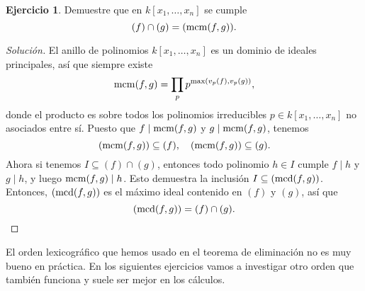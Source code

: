 \documentclass{article}
\theoremstyle{definition}
\newtheorem{ejerc}{Ejercicio}
\newenvironment{solucion}{\begin{proof}[Solución]}{\end{proof}}
\begin{document}
\begin{ejerc}
  Demuestre que en $k [x_1,\ldots,x_n]$ se cumple
  $$(f) \cap (g) = (\operatorname{mcm} (f,g)).$$

  \ifdefined\solutions\begin{solucion}
    El anillo de polinomios $k [x_1,\ldots,x_n]$ es un dominio de ideales
    principales, así que siempre existe
    $$\operatorname{mcm} (f,g) = \prod_p p^{\max (v_p (f), v_p (g))},$$
    donde el producto es sobre todos los polinomios irreducibles
    $p \in k [x_1,\ldots,x_n]$ no asociados entre sí.  Puesto que
    $f \mid \operatorname{mcm} (f,g)$ y $g \mid \operatorname{mcm} (f,g)$, tenemos
    $$(\operatorname{mcm} (f,g)) \subseteq (f), \quad (\operatorname{mcm} (f,g)) \subseteq (g).$$
    Ahora si tenemos $I \subseteq (f) \cap (g)$, entonces todo polinomio
    $h \in I$ cumple $f \mid h$ y $g \mid h$, y luego $\operatorname{mcm} (f,g) \mid h$. Esto
    demuestra la inclusión $I \subseteq (\operatorname{mcd} (f,g))$. Entonces, $(\operatorname{mcd} (f,g))$
    es el máximo ideal contenido en $(f)$ y $(g)$, así que
    \[ (\operatorname{mcd} (f,g)) = (f) \cap (g). \qedhere \]
  \end{solucion}\fi
\end{ejerc}

El orden lexicográfico que hemos usado en el teorema de eliminación no es muy
bueno en práctica. En los siguientes ejercicios vamos a investigar otro orden
que también funciona y suele ser mejor en los cálculos.
\end{document}
